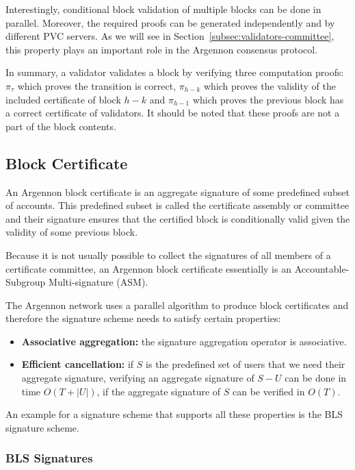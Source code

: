 Interestingly, conditional block validation of multiple blocks can be done in parallel. Moreover, the required proofs
can be generated independently and by different PVC servers. As we will see in
Section~\ref{subsec:validators-committee}, this property plays an important role in the Argennon consensus protocol.

In summary, a validator validates a block by verifying three computation proofs: $\pi_{\tau}$ which proves the
transition is correct, $\pi_{h-k}$ which proves the validity of the included certificate of block $h-k$ and $\pi_{h-1}$
which proves the previous block has a correct certificate of validators. It should be noted that these proofs are not
a part of the block contents.

\subsection{Block Certificate}\label{subsec:block-certificate}

An Argennon block certificate is an aggregate signature of some predefined subset of accounts. This predefined subset
is called the certificate assembly or committee and their signature ensures that the certified block is conditionally
valid given the validity of some previous block.

Because it is not usually possible to collect the signatures of all members of a certificate committee, an Argennon
block certificate essentially is an Accountable-Subgroup Multi-signature (ASM).

The Argennon network uses a parallel algorithm to produce block certificates and therefore the signature scheme needs
to satisfy certain properties:
\begin{itemize}
    \item \textbf{Associative aggregation:} the signature aggregation operator is associative.
    \item \textbf{Efficient cancellation:} if $S$ is the predefined set of users that we need their aggregate
    signature, verifying an aggregate signature of $S-U$ can be done in time $O(T+|U|)$, if the aggregate
    signature of $S$ can be verified in $O(T)$.
\end{itemize}

An example for a signature scheme that supports all these properties is the BLS signature scheme.

\subsubsection{BLS Signatures}

